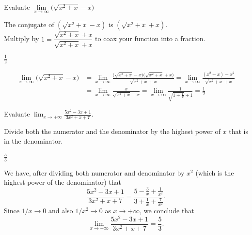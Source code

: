 \begin{question}[1999H]
Evaluate
$\lim\limits_{x\rightarrow\infty}\big(\sqrt{x^2+x}-x\big)$
\end{question}
\begin{hint}
The conjugate of $(\sqrt{x^2+x}-x)$ is $(\sqrt{x^2+x}+x)$.\\
 Multiply by $1=\dfrac{\sqrt{x^2+x}+x}
                                 {\sqrt{x^2+x}+x}$
             to coax your function into a fraction.
\end{hint}
\begin{answer} $\frac{1}{2}$
\end{answer}
\begin{solution}
\begin{align*}
\lim_{x\rightarrow\infty}\big(\sqrt{x^2+x}-x\big)
&=\lim_{x\rightarrow\infty}
\frac{\big(\sqrt{x^2+x}-x\big)\big(\sqrt{x^2+x}+x\big)}
     {\sqrt{x^2+x}+x}
=\lim_{x \to \infty}\frac{(x^2+x)-x^2}{\sqrt{x^2+x}+x}\\
&=\lim_{x\rightarrow\infty}
\frac{x}{\sqrt{x^2+x}+x}
=\lim_{x\rightarrow\infty}
\frac{1}{\sqrt{1+\frac{1}{x}}+1}
=\frac{1}{2}
\end{align*}\end{solution}



\begin{question}[2015Q]
Evaluate $\displaystyle \lim_{x\to +\infty} \frac{5x^2-3x+1}{3x^2 +x+7}.$
\end{question}
\begin{hint}
Divide both the numerator and the denominator by the highest
         power of $x$ that is in the denominator.
\end{hint}
\begin{answer}
$\frac{5}{3}$
\end{answer}
\begin{solution}
We have, after dividing both numerator and denominator by $x^2$ (which is the highest power of the denominator) that
$$\frac{5x^2-3x+1}{3x^2+x+7}=\frac{5-\frac{3}{x}+\frac{1}{x^2}}{3+\frac{1}{x}+\frac{7}{x^2}}.$$
Since $1/x\to 0$ and also $1/x^2\to 0$ as $x\to +\infty$, we conclude that
$$\lim_{x\to +\infty} \frac{5x^2-3x+1}{3x^2 +x+7}=\frac{5}{3}.$$
\end{solution}





